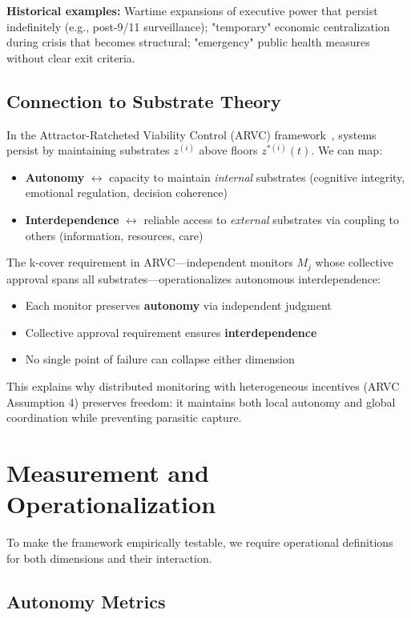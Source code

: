 \documentclass[11pt,a4paper]{article}
\begin{document}
\textbf{Historical examples:} Wartime expansions of executive power that persist indefinitely (e.g., post-9/11 surveillance); "temporary" economic centralization during crisis that becomes structural; "emergency" public health measures without clear exit criteria.

\subsection{Connection to Substrate Theory}

In the Attractor-Ratcheted Viability Control (ARVC) framework~\cite{arvc}, systems persist by maintaining substrates $z^{(i)}$ above floors $z^{*(i)}(t)$. We can map:

\begin{itemize}
    \item \textbf{Autonomy} $\leftrightarrow$ capacity to maintain \emph{internal} substrates (cognitive integrity, emotional regulation, decision coherence)
    \item \textbf{Interdependence} $\leftrightarrow$ reliable access to \emph{external} substrates via coupling to others (information, resources, care)
\end{itemize}

The k-cover requirement in ARVC---independent monitors $M_j$ whose collective approval spans all substrates---operationalizes autonomous interdependence:
\begin{itemize}
    \item Each monitor preserves \textbf{autonomy} via independent judgment
    \item Collective approval requirement ensures \textbf{interdependence}
    \item No single point of failure can collapse either dimension
\end{itemize}

This explains why distributed monitoring with heterogeneous incentives (ARVC Assumption 4) preserves freedom: it maintains both local autonomy and global coordination while preventing parasitic capture.

\section{Measurement and Operationalization}

To make the framework empirically testable, we require operational definitions for both dimensions and their interaction.

\subsection{Autonomy Metrics}
\end{document}
